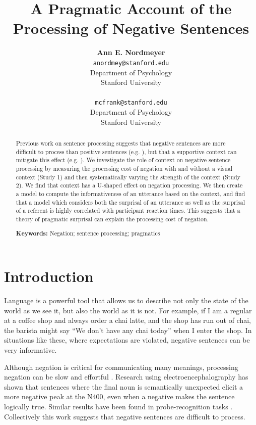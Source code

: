 \documentclass[10pt,letterpaper]{article}
\title{A Pragmatic Account of the Processing of Negative Sentences}
\author{{\large \bf Ann E. Nordmeyer} \\ \texttt{anordmey@stanford.edu}\\ Department of Psychology \\ Stanford University \\ 
\And {\large \bf Michael C. Frank} \\ \texttt{mcfrank@stanford.edu} \\ Department of Psychology \\ Stanford University \\ }
\begin{document}
\maketitle

\begin{abstract}

Previous work on sentence processing suggests that negative sentences are more difficult to process than positive sentences (e.g. ), but that a supportive context can mitigate this effect (e.g. ).  We investigate the role of context on negative sentence processing by measuring the processing cost of negation with and without a visual context (Study 1) and then systematically varying the strength of the context (Study 2).  We find that context has a U-shaped effect on negation processing.  We then create a model to compute the informativeness of an utterance based on the context, and find that a model which considers both the surprisal of an utterance as well as the surprisal of a referent is highly correlated with participant reaction times.  This suggests that a theory of pragmatic surprisal can explain the processing cost of negation.  

\textbf{Keywords:} 
Negation; sentence processing; pragmatics
\end{abstract}

\section{Introduction}


Language is a powerful tool that allows us to describe not only the state of the world as we see it, but also the world as it is not.  For example, if I am a regular at a coffee shop and always order a chai latte, and the shop has run out of chai, the barista might say ``We don't have any chai today'' when I enter the shop.  In situations like these, where expectations are violated, negative sentences can be very informative.  

Although negation is critical for communicating many meanings, processing negation can be slow and effortful \cite{hclark1972, carpenter1975, just1971, just1976}.  Research using electroencephalography has shown that sentences where the final noun is semantically unexpected elicit a more negative peak at the N400, even when a negative makes the sentence logically true.  Similar results have been found in probe-recognition tasks \cite{kaup2003, kaup2006, hasson2006}.  Collectively this work suggests that negative sentences are difficult to process.
 
\end{document}
